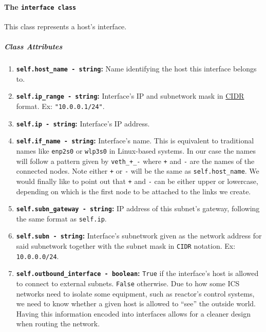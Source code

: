                 \paragraph{The \texttt{interface class}}
                    This class represents a host's interface.

                    \subparagraph{Class Attributes}
                        \begin{enumerate}
                            \item \textbf{\texttt{self.host\_name - string}:} Name identifying the host this interface belongs to.
                            \item \textbf{\texttt{self.ip\_range - string}:} Interface's IP and subnetwork mask in \href{https://en.wikipedia.org/wiki/Classless_Inter-Domain_Routing}{CIDR} format. Ex: \texttt{"10.0.0.1/24"}.
                            \item \textbf{\texttt{self.ip - string}:} Interface's IP address.
                            \item \textbf{\texttt{self.if\_name - string}:} Interface's name. This is equivalent to traditional names like \texttt{enp2s0} or \texttt{wlp3s0} in Linux-based systems. In our case the names will follow a pattern given by \texttt{veth\_+\_-} where \texttt{+} and \texttt{-} are the names of the connected nodes. Note either \texttt{+} or \texttt{-} will be the same as \texttt{self.host\_name}. We would finally like to point out that \texttt{+} and \texttt{-} can be either upper or lowercase, depending on which is the first node to be attached to the links we create.
                            \item \textbf{\texttt{self.subn\_gateway - string}:} IP address of this subnet's gateway, following the same format as \texttt{self.ip}.
                            \item \textbf{\texttt{self.subn - string}:} Interface's subnetwork given as the network address for said subnetwork together with the subnet mask in \texttt{CIDR} notation. Ex: \texttt{10.0.0.0/24}.
                            \item \textbf{\texttt{self.outbound\_interface - boolean}:} \texttt{True} if the interface's host is allowed to connect to external subnets. \texttt{False} otherwise. Due to how some ICS networks need to isolate some equipment, such as reactor's control systems, we need to know whether a given host is allowed to ``see'' the outside world. Having this information encoded into interfaces allows for a cleaner design when routing the network.
                        \end{enumerate}


